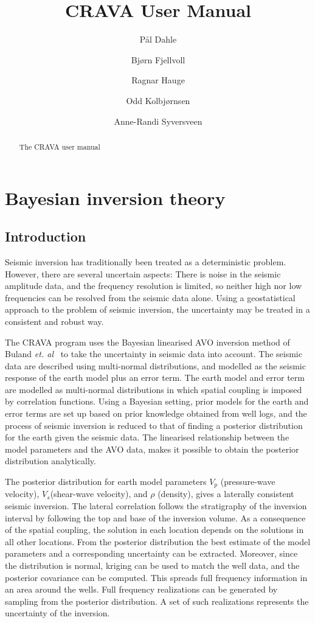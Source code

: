 \documentclass[screen,citenumeric,long,10pt]{nrdoc_060418}
\title{CRAVA User Manual}
\author{P{\aa}l Dahle\and Bj{\o}rn Fjellvoll\and Ragnar Hauge\and Odd Kolbj{\o}rnsen\and Anne-Randi Syversveen}
\newcommand{\vp}{\ensuremath{V_p}\xspace}      %
\newcommand{\vs}{\ensuremath{V_s}\xspace}      %
\newcommand{\crava} {\textsf{CRAVA}\xspace}
\begin{document}
\maketitle

\begin{abstract}
The CRAVA user manual
\end{abstract}

\tableofcontents
\clearemptydoublepage

\chapter{Bayesian inversion theory}
\label{sec:geostat-theory}
\begin{multicols}{2}

\section{Introduction}
Seismic inversion has traditionally been treated as a deterministic
problem. However, there are several uncertain aspects: There is noise
in the seismic amplitude data, and the frequency resolution is
limited, so neither high nor low frequencies can be resolved from the
seismic data alone. Using a geostatistical approach to the problem of
seismic inversion, the uncertainty may be treated in a consistent and
robust way. 

The \crava program uses the Bayesian linearised AVO
inversion method of Buland {\it et. al}~\cite{geo68ab2} to take
the uncertainty in seismic data into account. The seismic data are
described using multi-normal distributions, and modelled as the seismic
response of the earth model plus an error term. The earth model and
error term are modelled as multi-normal distributions in which spatial
coupling is imposed by correlation functions. Using a Bayesian
setting, prior models for the earth and error terms are set up based
on prior knowledge obtained from well logs, and the process of seismic
inversion is reduced to that of finding a posterior distribution for
the earth given the seismic data. The linearised relationship between
the model parameters and the AVO data, makes it possible to obtain the
posterior distribution analytically.

The posterior distribution for earth model parameters \vp
(pressure-wave velocity), \vs (shear-wave velocity), and $\rho$
(density), gives a laterally consistent seismic inversion. The lateral
correlation follows the stratigraphy of the inversion interval by
following the top and base of the inversion volume. As a consequence
of the spatial coupling, the solution in each location depends on the
solutions in all other locations. From the posterior distribution the
best estimate of the model parameters and a corresponding uncertainty
can be extracted. Moreover, since the distribution is normal, kriging
can be used to match the well data, and the posterior covariance can
be computed. This spreads full frequency information in an area around
the wells. Full frequency realizations can be generated by sampling
from the posterior distribution. A set of such realizations represents
the uncertainty of the inversion.


\end{multicols}
\end{document}
